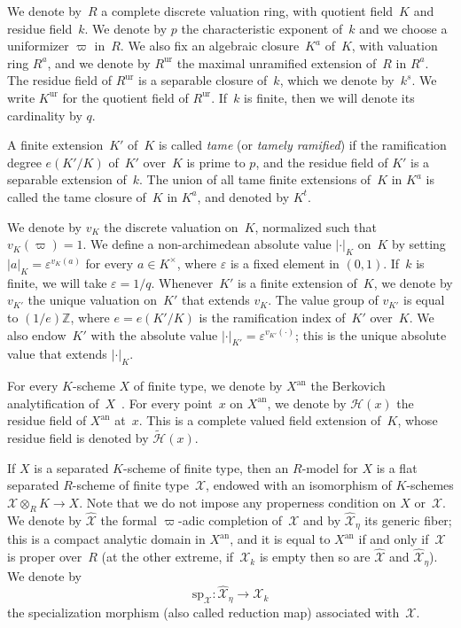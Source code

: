 \documentclass[11pt]{article}
\theoremstyle{definition}
\numberwithin{equation}{subsection}
\newcommand{\Z}{\ensuremath{\mathbb{Z}}}
\newcommand{\cX}{\ensuremath{\mathscr{X}}}
\newcommand{\an}{\mathrm{an}}
\newcommand{\spe}{\mathrm{sp}}
\newcommand{\ur}{\mathrm{ur}}
\let\unif\varpi
\begin{document}
We denote by~$R$ a complete discrete valuation ring, with quotient field~$K$ and residue field~$k$. We denote by $p$ the characteristic exponent of~$k$ and we choose a uniformizer $\unif$ in~$R$. We also fix an algebraic closure~$K^a$ of~$K$, with valuation ring $R^a$, and we denote by $R^{\ur}$ the maximal unramified extension of~$R$ in $R^{a}$.
The residue field of $R^{\ur}$ is a separable closure of~$k$, which we denote by~$k^s$. We write $K^{\ur}$ for the quotient field of $R^{\ur}$.
If~$k$ is finite, then we will denote its cardinality
by $q$.

A finite extension~$K'$ of~$K$ is called {\em tame} (or {\em tamely ramified}) if the ramification degree $e(K'/K)$ of~$K'$ over~$K$ is prime to $p$, and the residue field of
$K'$ is a separable extension of~$k$. The union of all tame finite extensions of~$K$ in $K^a$ is called the tame closure of~$K$ in $K^a$, and denoted by $K^t$.

We denote by $v_K$ the discrete valuation on~$K$, normalized such that $v_K(\unif)=1$. We define a non-archimedean absolute value $|\cdot|_K$ on~$K$ by setting
$|a|_K=\varepsilon^{v_K(a)}$ for every $a\in K^{\times}$, where $\varepsilon$ is a fixed element in $(0,1)$. If~$k$ is finite, we will take $\varepsilon=1/q$. Whenever~$K'$ is a finite extension of~$K$, we denote by $v_{K'}$ the unique valuation on~$K'$ that extends $v_K$. The value group of $v_{K'}$ is equal to $(1/e)\Z$, where $e=e(K'/K)$ is the ramification index of~$K'$ over~$K$.
We also endow~$K'$ with the absolute value $|\cdot|_{K'}=\varepsilon^{v_{K'}(\cdot)}$; this is the unique absolute value that extends $|\cdot|_K$.

For every $K$\nobreakdash-scheme $X$ of finite type, we denote by $X^{\an}$ the Berkovich analytification of~$X$~\cite{berk}. For every point~$x$ on $X^{\an}$, we denote by $\mathscr{H}(x)$ the residue field of $X^{\an}$ at~$x$. This is a complete valued field extension of~$K$, whose residue field is denoted by $\widetilde{\mathscr{H}}(x)$.

If $X$ is a separated $K$\nobreakdash-scheme of finite type, then an $R$\nobreakdash-model for $X$ is a flat separated $R$\nobreakdash-scheme of finite type~$\cX$, endowed with an isomorphism of $K$\nobreakdash-schemes $\cX\otimes_R K\to X$. Note that we do not impose any properness condition on $X$ or~$\cX$. We denote by $\widehat{\cX}$ the formal $\unif$-adic completion of~$\cX$ and by
$\widehat{\cX}_\eta$ its generic fiber; this is a compact analytic domain in $X^{\an}$, and it is equal to $X^{\an}$ if and only if~$\cX$ is proper over~$R$ (at the other extreme, if~$\cX_k$ is empty then so are $\widehat{\cX}$ and $\widehat{\cX}_\eta$). We denote by
\[
\spe_{\cX}:\widehat{\cX}_\eta\to \cX_k
\]
the specialization morphism (also called reduction map) associated with~$\cX$.
\end{document}
